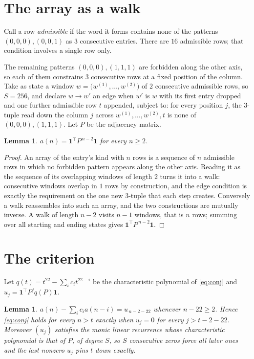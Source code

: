 \documentclass[11pt,a4paper]{article}
\theoremstyle{plain}
\newtheorem{lemma}[theorem]{Lemma}
\theoremstyle{definition}
\begin{document}
\section{The array as a walk}

Call a row \emph{admissible} if the word it forms contains none of the patterns
$(0,0,0), (0,0,1)$ as $3$ consecutive entries. There are $16$ admissible rows; that condition
involves a single row only.

The remaining patterns $(0,0,0), (1,1,1)$ are forbidden along the other axis, so each of them
constrains $3$ consecutive rows at a fixed position of the column. Take as state a
window $w=\bigl(w^{(1)},\dots,w^{(2)}\bigr)$ of $2$ consecutive admissible
rows, so $S=256$, and declare $w\to w'$ an edge when $w'$ is $w$ with its first entry
dropped and one further admissible row $t$ appended, subject to: for every position
$j$, the $3$-tuple read down the column $j$ across $w^{(1)},\dots,w^{(2)},t$
is none of $(0,0,0), (1,1,1)$. Let $P$ be the adjacency matrix.

\begin{lemma}\label{lem:walk}
$a(n)=\mathbf{1}^{\!\top}P^{\,n-2}\mathbf{1}$ for every $n\ge2$.
\end{lemma}

\begin{proof}
An array of the entry's kind with $n$ rows is a sequence of $n$ admissible rows in
which no forbidden pattern appears along the other axis. Reading it as the sequence of its
overlapping windows of length $2$ turns it into a walk: consecutive windows overlap in
$1$ rows by construction, and the edge condition is exactly the requirement on the one
new $3$-tuple that each step creates. Conversely a walk reassembles into such an array,
and the two constructions are mutually inverse. A walk of length $n-2$ visits $n-1$
windows, that is $n$ rows; summing over all starting and ending states gives
$\mathbf{1}^{\!\top}P^{\,n-2}\mathbf{1}$.
\end{proof}

\section{The criterion}

Let $q(t)=t^{22}-\sum_i c_i t^{22-i}$ be the characteristic polynomial of
\eqref{eq:conj} and $u_j=\mathbf{1}^{\!\top}P^{j}q(P)\mathbf{1}$.

\begin{lemma}\label{lem:crit}
$a(n)-\sum_i c_i a(n-i)=u_{\,n-2-22}$ whenever $n-22\ge2$. Hence
\eqref{eq:conj} holds for every $n>t$ exactly when $u_j=0$ for every
$j>t-2-22$. Moreover $(u_j)$ satisfies the monic linear recurrence whose
characteristic polynomial is that of $P$, of degree $S$, so $S$ consecutive zeros force all
later ones and the last nonzero $u_j$ pins $t$ down exactly.
\end{lemma}
\end{document}
